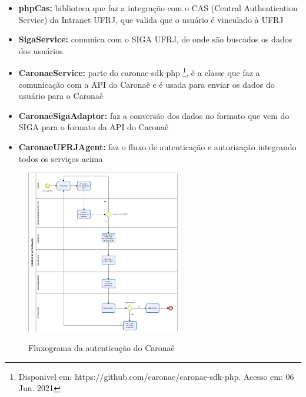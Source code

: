 \begin{itemize}
   

 \item \textbf{phpCas:} biblioteca que faz a integração com o CAS (Central Authentication Service) da Intranet UFRJ, que valida que o usuário é vinculado à UFRJ

 \item \textbf{SigaService:} comunica com o SIGA UFRJ, de onde são buscados os dados dos usuários 

 \item \textbf{CaronaeService:} parte do caronae-sdk-php \footnote{Disponivel em: https://github.com/caronae/caronae-sdk-php. Acesso em: 06 Jun. 2021}, é a classe que faz a comunicação com a API do Caronaê e é usada para enviar os dados do usuário para o Caronaê

 \item \textbf{CaronaeSigaAdaptor:} faz a conversão dos dados no formato que vem do SIGA para o formato da API do Caronaê

 \item \textbf{CaronaeUFRJAgent:} faz o fluxo de autenticação e autorização integrando todos os serviços acima
\end{itemize}


\begin{figure}[!hbtp]
	\centering
	\caption{Fluxograma da autenticação do Caronaê}
	\includegraphics[width=0.6\textwidth]{./04-figuras/caronae/diagrama_bizagi.jpg}
	\label{fig:fluxograma}
\end{figure}

